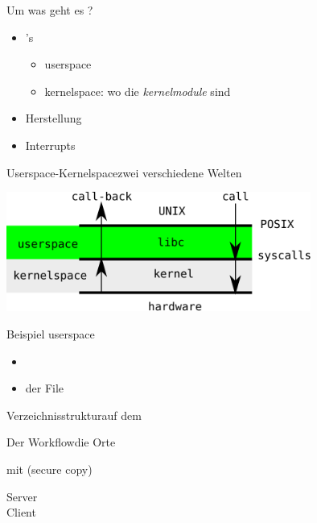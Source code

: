 \documentclass{beamer}
\newcommand{\kernelmodule}{{\em kernelmodule}\xspace}
\begin{document}
\begin{frame}{Um was geht es ?}
 \begin{itemize}
  \item \linux \kernelmodule's
  \begin{itemize}
   \item userspace
   \item kernelspace: wo die \kernelmodule sind
  \end{itemize}
  \item Herstellung
  \item Interrupts
 \end{itemize}
\end{frame}

\begin{frame}{Userspace-Kernelspace}{zwei verschiedene Welten}
 \begin{center}
 \includegraphics[width=0.75\textwidth]{userspace-kernelspace.pdf}
 \end{center}
\end{frame}

\begin{frame}{}{Beispiel userspace}
 \begin{itemize}
  \item {}
  \item der File 
 \end{itemize}
\end{frame}

\begin{frame}{Verzeichnisstruktur}{auf dem \host}
\end{frame}

\begin{frame}{Der Workflow}{die Orte}
 \vspace{-2mm}
 \begin{description}[\target]
  \item[\host] 
  \item[\target]
  \item[Verbindung] mit  (secure copy)
   \begin{description}
   \item[Server]  \target
   \item[Client] \host
  \end{description}
 \end{description}
\end{frame}
\end{document}
